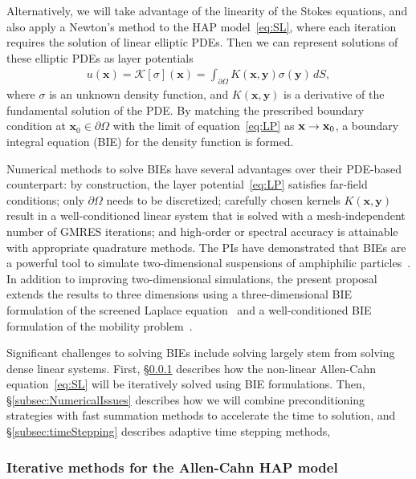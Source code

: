Alternatively, we will take advantage of the linearity of the Stokes
equations, and also apply a Newton's method to the HAP
model~\eqref{eq:SL}, where each iteration requires the solution of
linear elliptic PDEs. Then we can represent solutions of these elliptic
PDEs as layer potentials
\begin{align}
  \label{eq:LP}
  u(\mathbf{x}) = \mathcal{K}[\sigma](\mathbf{x}) = 
  \int_{\partial\Omega} K(\mathbf{x},\mathbf{y})
  \sigma(\mathbf{y})\,dS,
\end{align}
where $\sigma$ is an unknown density function, and
$K(\mathbf{x},\mathbf{y})$ is a derivative of the fundamental solution
of the PDE. By matching the prescribed boundary condition at
$\mathbf{x}_0 \in \partial\Omega$ with the limit of
equation~\eqref{eq:LP} as $\mathbf{x} \rightarrow \mathbf{x}_0$, a boundary integral
equation (BIE) for the density function is formed. 

Numerical methods to solve BIEs have several advantages over their
PDE-based counterpart: by construction, the layer
potential~\eqref{eq:LP} satisfies far-field conditions; only
$\partial\Omega$ needs to be discretized; carefully chosen kernels
$K(\mathbf{x},\mathbf{y})$ result in a well-conditioned linear system
that is solved with a mesh-independent number of GMRES iterations; and
high-order or spectral accuracy is attainable with appropriate
quadrature methods. The PIs have demonstrated that BIEs are a powerful
tool to simulate two-dimensional suspensions of amphiphilic
particles~\cite{Fu2018_SIAM, FuQuRyYo20}. In addition to improving
two-dimensional simulations, the present proposal extends the results to
three dimensions using a three-dimensional BIE formulation of the
screened Laplace equation~\cite{ying_2006} and a well-conditioned BIE
formulation of the mobility problem~\cite{manasthesis, rac-gre2016}.

Significant challenges to solving BIEs include solving largely stem from
solving dense linear systems. First, \S\ref{subsec:AC} describes how the
non-linear Allen-Cahn equation~\eqref{eq:SL} will be iteratively solved
using BIE formulations. Then, \S\ref{subsec:NumericalIssues} describes
how we will combine preconditioning strategies with fast summation
methods to accelerate the time to solution, and
\S\ref{subsec:timeStepping} describes adaptive time stepping methods,

\subsubsection{Iterative methods for the Allen-Cahn HAP model}
\label{subsec:AC}


